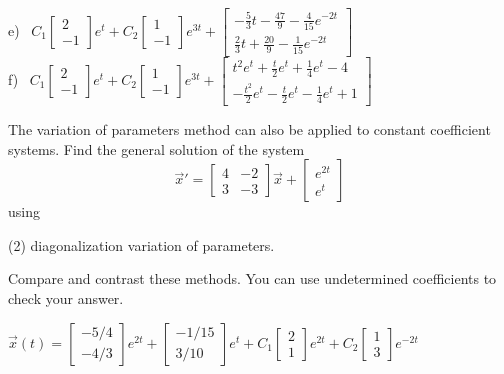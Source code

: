 {e)~ $C_1\left[\begin{smallmatrix} 2 \\ -1 \end{smallmatrix}\right]e^{t} + C_2\left[\begin{smallmatrix} 1 \\ -1 \end{smallmatrix}\right]e^{3t} + \left[\begin{smallmatrix} -\frac{5}{3}t - \frac{47}{9} - \frac{4}{15}e^{-2t} \\ \frac{2}{3}t + \frac{20}{9} - \frac{1}{15}e^{-2t} \end{smallmatrix}\right]$ \\
f)~  $C_1\left[\begin{smallmatrix} 2 \\ -1 \end{smallmatrix}\right]e^{t} + C_2\left[\begin{smallmatrix} 1 \\ -1 \end{smallmatrix}\right]e^{3t} + \left[\begin{smallmatrix} t^2e^t + \frac{t}{2}e^t + \frac{1}{4}e^t - 4 \\ -\frac{t^2}{2}e^t - \frac{t}{2}e^t - \frac{1}{4}e^t + 1 \end{smallmatrix}\right]$
}

\begin{exercise}
The variation of parameters method can also be applied to constant coefficient systems. Find the general solution of the system
\[ {\vec{x}}' = \begin{bmatrix} 4 & -2 \\ 3 & -3 \end{bmatrix} \vec{x} + \begin{bmatrix} e^{2t} \\ e^t \end{bmatrix} \] using 
\begin{tasks}(2)
\task diagonalization
\task variation of parameters.
\end{tasks}
Compare and contrast these methods. You can use undetermined coefficients to check your answer.
\end{exercise}
\comboSol{%
}
{%
$\vec{x}(t) = \left[\begin{smallmatrix} -5/4 \\ -4/3 \end{smallmatrix}\right]e^{2t} + \left[\begin{smallmatrix} -1/15 \\ 3/10 \end{smallmatrix}\right]e^t + C_1\left[\begin{smallmatrix} 2 \\ 1 \end{smallmatrix}\right]e^{2t} + C_2\left[\begin{smallmatrix} 1 \\ 3 \end{smallmatrix}\right]e^{-2t}$
}

